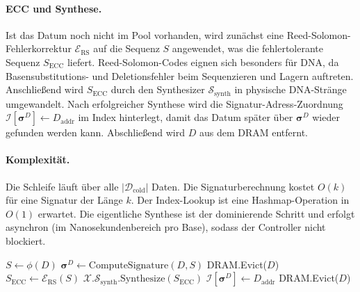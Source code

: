 ﻿\documentclass[a4paper,12pt]{article}
\theoremstyle{definition}
\begin{document}
\paragraph{ECC und Synthese.}
Ist das Datum noch nicht im Pool vorhanden, wird zunächst eine Reed-Solomon-Fehlerkorrektur $\mathcal{E}_{\mathrm{RS}}$ auf die Sequenz $S$ angewendet, was die fehlertolerante Sequenz $S_{\mathrm{ECC}}$ liefert. Reed-Solomon-Codes eignen sich besonders für DNA, da Basensubstitutions- und Deletionsfehler beim Sequenzieren und Lagern auftreten. Anschließend wird $S_{\mathrm{ECC}}$ durch den Synthesizer $\mathcal{S}_{\mathrm{synth}}$ in physische DNA-Stränge umgewandelt. Nach erfolgreicher Synthese wird die Signatur-Adress-Zuordnung $\mathcal{I}[\boldsymbol{\sigma}^D] \gets D_{\mathrm{addr}}$ im Index hinterlegt, damit das Datum später über $\boldsymbol{\sigma}^D$ wieder gefunden werden kann. Abschließend wird $D$ aus dem DRAM entfernt.

\paragraph{Komplexität.}
Die Schleife läuft über alle $|\mathcal{D}_{\mathrm{cold}}|$ Daten. Die Signaturberechnung kostet $O(k)$ für eine Signatur der Länge $k$. Der Index-Lookup ist eine Hashmap-Operation in $O(1)$ erwartet. Die eigentliche Synthese ist der dominierende Schritt und erfolgt asynchron (im Nanosekundenbereich pro Base), sodass der Controller nicht blockiert.

\begin{algorithm}[H]
  \caption{DNA-Demotion-Algorithmus}
  \label{alg:demotion}
  \begin{algorithmic}[1]
      \State $S \gets \phi(D)$ 
      \State $\boldsymbol{\sigma}^D \gets \mathrm{ComputeSignature}(D, S)$
       
        \State DRAM.Evict($D$)
      \Else
        \State $S_{\mathrm{ECC}} \gets \mathcal{E}_{\mathrm{RS}}(S)$
        \State $\mathcal{X}.\mathcal{S}_{\mathrm{synth}}.\mathrm{Synthesize}(S_{\mathrm{ECC}})$
        \State $\mathcal{I}[\boldsymbol{\sigma}^D] \gets D_{\mathrm{addr}}$
        \State DRAM.Evict($D$)
      \EndIf
    \EndFor
  \end{algorithmic}
\end{algorithm}
\end{document}
